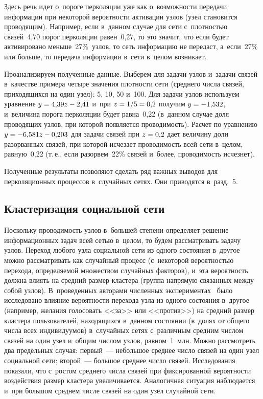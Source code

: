 \begin{multicols}{2}
  Здесь речь идет о~пороге перколяции уже как о~воз\-мож\-ности передачи 
информации при некоторой ве\-ро\-ят\-ности активации узлов (узел становится 
проводящим). Например, если в~дан\-ном случае для сети с~плот\-ностью 
связей~4,70 порог перколяции равен~0,27, то это значит, что если будет 
активировано меньше~27\%~узлов, то сеть информацию не передаст, 
а~если~27\% или больше, то передача информации в~сети в~целом возникает. 
  
  Проанализируем полученные данные. Выберем для задачи узлов и~задачи 
связей в~качестве примера четыре значения плот\-ности сети (среднего чис\-ла 
связей, приходящихся на один узел): 5, 10, 50 и~100. Для задачи узлов 
используем урав\-не\-ние $y\hm=4{,}39z\hm-2{,}41$ и~при $z \hm=1/5\hm=0{,}2$ 
получим $y\hm= -1{,}532$, и~величина порога пер\-ко\-ля\-ции будет рав\-на~0,22 
(в~данном случае доля проводящих узлов, при которой появляется 
про\-во\-ди\-мость). Рас\-чет по урав\-не\-нию $y\hm= -6{,}581z\hm- 0{,}203$ для задачи 
связей при $z\hm=0{,}2$ дает величину доли разорванных связей, при которой 
исчезает про\-во\-ди\-мость всей сети в~целом, рав\-ную~0,22 (т.\,е., если 
разорвем~22\% связей и~более, про\-во\-ди\-мость исчезнет).
  
  Полученные результаты позволяют сделать  ряд важ\-ных выводов
  для перколяционных процессов 
в~случайных сетях. Они приводятся в~разд.~5.
  
\subsection{Кластеризация социальной сети}

  Поскольку проводимость узлов в~большей степени определяет решение 
информационных задач всей сетью в~целом, то будем рас\-смат\-ри\-вать задачу 
узлов. Переход любого узла социальной сети из одного со\-сто\-яния в~другое 
можно рас\-смат\-ри\-вать как случайный процесс (с~некоторой вероятностью 
перехода, опре\-де\-ля\-емой множеством случайных факторов), и~эта ве\-ро\-ят\-ность 
должна влиять на средний раз\-мер клас\-те\-ра (группа напрямую связанных между 
собой узлов). В~проведенных авторами чис\-лен\-ных 
 экспериментах~\cite{12-zh, 14-zh} было исследовано влияние вероятности 
перехода узла из одного со\-сто\-яния в~другое (например, желания голосовать 
<<за>> или <<против>>) на средний раз\-мер клас\-те\-ра пользователей, 
находящихся в~данном со\-сто\-янии (в~долях от общего чис\-ла всех 
индивидуумов) в~случайных сетях с~различным средним чис\-лом связей на один 
узел и~общим чис\-лом узлов, равном~1~млн. Можно рас\-смот\-реть два 
предельных случая: первый~--- небольшое среднее чис\-ло связей на 
один узел социальной сети; второй~--- большое среднее 
чис\-ло связей. Исследования показали, что с~рос\-том среднего чис\-ла связей при 
фиксированной ве\-ро\-ят\-ности воздействия раз\-мер клас\-те\-ра увеличивается. 
Аналогичная ситуация наблю\-да\-ет\-ся и~при большом среднем чис\-ле связей на 
один узел случайной сети.
  

\end{multicols}
